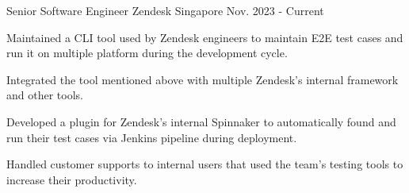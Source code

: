 

\begin{cventries}

  \cventry
    {Senior Software Engineer} %
    {Zendesk} %
    {Singapore} %
    {Nov. 2023 - Current} %
    {
      \begin{cvitems} %
        \item {Maintained a CLI tool used by Zendesk engineers to maintain E2E test cases and run it on multiple platform during the development cycle.}
        \item {Integrated the tool mentioned above with multiple Zendesk's internal framework and other tools.}
        \item {Developed a plugin for Zendesk's internal Spinnaker to automatically found and run their test cases via Jenkins pipeline during deployment.}
        \item {Handled customer supports to internal users that used the team's testing tools to increase their productivity.}
      \end{cvitems}
    }


\end{cventries}
